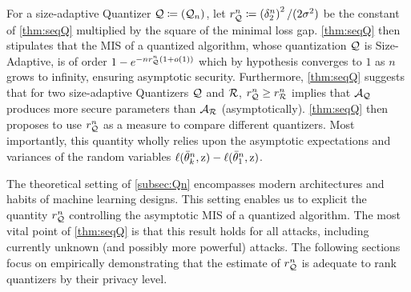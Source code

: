 For a size-adaptive Quantizer ${\mathcal{Q}}\coloneqq ({\mathcal{Q}}_n)$, let $r_{{\mathcal{Q}}}^n\coloneqq \left(\delta_2^n\right)^2/(2\sigma^2)$ be the constant of \autoref{thm:seqQ} multiplied by the square of the minimal loss gap. \autoref{thm:seqQ} then stipulates that the MIS of a quantized algorithm, whose quantization ${\mathcal{Q}}$ is Size-Adaptive, is of order $1 - e^{-nr_{\mathcal{Q}}^n(1+o(1))}$ which by hypothesis converges to $1$ as $n$ grows to infinity, ensuring asymptotic security.
Furthermore, \autoref{thm:seqQ} suggests that for two size-adaptive Quantizers ${\mathcal{Q}}$ and ${\mathcal{R}}$,  $r_{\mathcal{Q}}^n \geq r_{\mathcal{R}}^n$ implies that ${\mathcal{A}}_{{\mathcal{Q}}}$ produces more secure parameters than ${\mathcal{A}}_{{\mathcal{R}}}$ (asymptotically). \autoref{thm:seqQ} then proposes to use $r_{\mathcal{Q}}^n$ as a measure to compare different quantizers. Most importantly, this quantity wholly relies upon the asymptotic expectations and variances of the random variables $\ell({\Bar{\theta}}_k^n,{\textnormal{z}}) - \ell({\Bar{\theta}}_1^n,{\textnormal{z}})$. 






\begin{remark}
The theoretical setting of \autoref{subsec:Qn} encompasses modern architectures and habits of machine learning designs. This setting enables us to explicit the quantity $r_{\mathcal{Q}}^n$ controlling the asymptotic MIS of a quantized algorithm. The most vital point of \autoref{thm:seqQ} is that this result holds for all attacks, including currently unknown (and possibly more powerful) attacks. 
The following sections focus on empirically demonstrating that the estimate of $r_{\mathcal{Q}}^n$ is adequate to rank quantizers by their privacy level.   
\end{remark}

